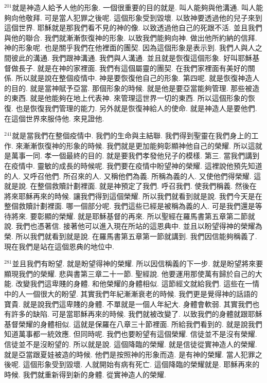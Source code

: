 \documentclass{book}
\begin{document}
$^{201}$就是神造人給予人他的形象.
一個很重要的目的就是.
叫人能夠與他溝通.
叫人能夠向他敬拜.
可是當人犯罪之後呢.
這個形象受到毀壞.
以致神要透過他的兒子來到這個世界.
耶穌就是那我們看不見的神的像.
以致透過他自己的死跟不活.
並且我們與他的聯合.
我們就漸漸恢復神的形象.
以致我們能夠向神.
做出他所約納的信拜.
神的形象呢.
也是關乎我們在他裡面的團契.
因為這個形象是表示到.
我們人與人之間彼此的溝通.
我們跟神溝通.
我們與人溝通.
並且就是恢復這個形象.
好叫耶穌基督做長子.
就是在神的家裡面.
我們有這個屬靈的團契.
在我們家裡面有美好的關係.
所以就是說在整個疫情中.
神是要恢復他自己的形象.
第四呢.
就是恢復神造人的目的.
就是當神賦予亞當.
那個形象的時候.
就是他是要亞當能夠管理.
那些被造的東西.
就是他能夠在地上代表神.
來管理這世界一切的東西.
所以這個形象的恢復.
也是恢復我們管理的能力.
另外就是恢復神給人的使命.
就是神造人是要他們.
在這個世界來服侍他.
來見證他.

$^{241}$就是當我們在整個疫情中.
我們的生命與主結聯.
我們得到聖靈在我們身上的工作.
來漸漸恢復神的形象的時候.
我們就是更加能夠彰顯神他自己的榮耀.
所以這就是萬事一同.
孝一個最終的目的.
就是要我們孝發他兒子的模樣.
第三.
當我們講到在疫情中.
靈敏的成長的時候呢.
我們要在疫情中盼望神的榮耀.
這裡說他預先知道的人.
又呼召他們.
所召來的人.
又稱他們為義.
所稱為義的人.
又使他們得榮耀.
這就是說.
在整個救贖計劃裡面.
就是神預定了我們.
呼召我們.
使我們稱義.
然後在將來耶穌再來的時候.
讓我們得到這個榮耀.
所以我們就看到就是說.
我們今天是在整個救贖計劃裡面.
哪一個部分呢.
我們這些已經是被稱為義的人.
可是我們還是等待將來.
要彰顯的榮耀.
就是耶穌基督的再來.
所以聖經在羅馬書第五章第二節就說.
我們也憑著信.
接著他可以進入現在所站的這恩典中.
並且以盼望得神的榮耀為榮.
所以我們就看到就是說.
在羅馬書第五章第一節就講到.
我們因信能夠稱義了.
現在我們是站在這個恩典的地位中.

$^{281}$並且我們有盼望.
就是盼望得神的榮耀.
所以因信稱義的下一步.
就是盼望將來要顯現我們的榮耀.
悲與書第三章二十一節.
聖經說.
他要運用那使萬有歸於自己的大能.
改變我們這卑賤的身體.
和他榮耀的身體相似.
這節經文就給我們.
這些在一情中的人一個很大的盼望.
其實我們年紀漸漸衰老的時候.
我們更是覺得神的話語的寶貴.
就是說我們這卑賤的身體.
不單就是一個人年紀大.
身體會軟弱.
其實我們也有許多的缺陷.
可是當耶穌再來的時候.
我們就被改變了.
以致我們的身體就跟耶穌基督榮耀的身體相似.
這就是保羅在八章三十節裡面.
所給我們看到的.
就是說我們知道萬事都一統效應.
但同時呢.
我們也要盼望有這個榮耀.
信徒並不是沒有榮耀.
信徒並不是沒盼望的.
所以就是說.
這個降臨的榮耀.
就是信徒從實神造人的榮耀.
就是亞當跟夏娃被造的時候.
他們是按照神的形象而造.
是有神的榮耀.
當人犯罪之後呢.
這個形象受到毀壞.
人就開始有病有死亡.
這個降臨的榮耀就是.
耶穌再來的時候.
我們就重新得到新的身體.
從實神造人的榮耀.
\end{document}

